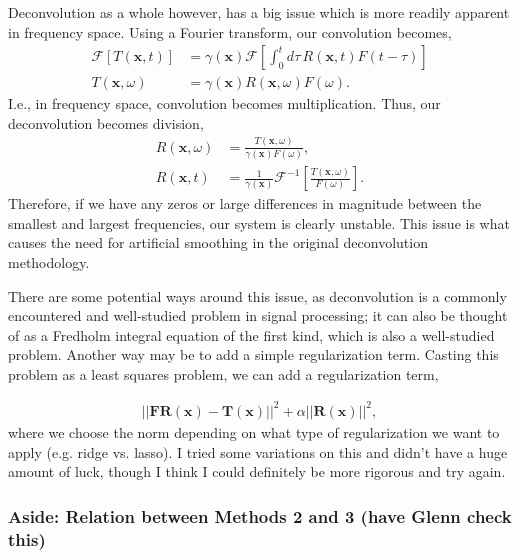Deconvolution as a whole however, has a big issue which is more readily apparent in frequency space. Using a Fourier transform, our convolution becomes,
\begin{align}
  \mathcal{F}\left[T(\mathbf{x},t)\right] &= \gamma(\mathbf{x}) \mathcal{F}\left[ \int_0^t d\tau \, R(\mathbf{x},t) F(t - \tau)\right] \\
  T(\mathbf{x},\omega) &= \gamma(\mathbf{x}) R(\mathbf{x},\omega) F(\omega).
\end{align}
I.e., in frequency space, convolution becomes multiplication. Thus, our deconvolution becomes division,
\begin{align}
  R(\mathbf{x},\omega) &= \frac{T(\mathbf{x},\omega)}{\gamma(\mathbf{x}) F(\omega)},\\
  R(\mathbf{x},t) &= \frac{1}{\gamma(\mathbf{x})}\mathcal{F}^{-1}\left[\frac{T(\mathbf{x},\omega)}{ F(\omega)}\right].
\end{align}
Therefore, if we have any zeros or large differences in magnitude between the smallest and largest frequencies, our system is clearly unstable. This issue is what causes the need for artificial smoothing in the original deconvolution methodology.

There are some potential ways around this issue, as deconvolution is a commonly encountered and well-studied problem in signal processing; it can also be thought of as a Fredholm integral equation of the first kind, which is also a well-studied problem. Another way may be to add a simple regularization term. Casting this problem as a least squares problem, we can add a regularization term,

\begin{align}
  ||\mathbf{F}\mathbf{R}(\mathbf{x}) - \mathbf{T}(\mathbf{x})||^2 + \alpha ||\mathbf{R}(\mathbf{x})||^2,
\end{align}
where we choose the norm depending on what type of regularization we want to apply (e.g. ridge vs. lasso). I tried some variations on this and didn't have a huge amount of luck, though I think I could definitely be more rigorous and try again.

\subsubsection*{Aside: Relation between Methods 2 and 3 (have Glenn check this)}


